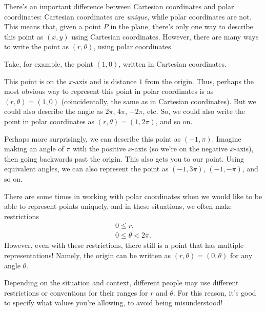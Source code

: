 \documentclass{ximera}
\begin{document}
There's an important difference between Cartesian coordinates and polar coordinates: Cartesian coordinates are \emph{unique}, while polar coordinates are not. This means that, given a point $P$ in the plane, there's only one way to describe this point as $(x,y)$ using Cartesian coordinates. However, there are many ways to write the point as $(r,\theta)$, using polar coordinates.

Take, for example, the point $(1,0)$, written in Cartesian coordinates.

\begin{image}
\end{image}

This point is on the $x$-axis and is distance $1$ from the origin. Thus, perhaps the most obvious way to represent this point in polar coordinates is as $(r,\theta) = (1,0)$ (coincidentally, the same as in Cartesian coordinates). But we could also describe the angle as $2\pi$, $4\pi$, $-2\pi$, etc. So, we could also write the point in polar coordinates as $(r,\theta) = (1,2\pi)$, and so on.

Perhaps more surprisingly, we can describe this point as $(-1,\pi)$. Imagine making an angle of $\pi$ with the positive $x$-axis (so we're on the negative $x$-axis), then going backwards past the origin. This also gets you to our point. Using equivalent angles, we can also represent the point as $(-1,3\pi)$, $(-1, -\pi)$, and so on.

There are some times in working with polar coordinates when we would like to be able to represent points uniquely, and in these situations, we often make restrictions
\[
\begin{array}{c}
0\leq r,\\
0\leq \theta < 2\pi.
\end{array}
\]
However, even with these restrictions, there still is a point that has multiple representations! Namely, the origin can be written as $(r,\theta) = (0,\theta)$ for any angle $\theta$.

Depending on the situation and context, different people may use different restrictions or conventions for their ranges for $r$ and $\theta$. For this reason, it's good to specify what values you're allowing, to avoid being misunderstood!
\end{document}
